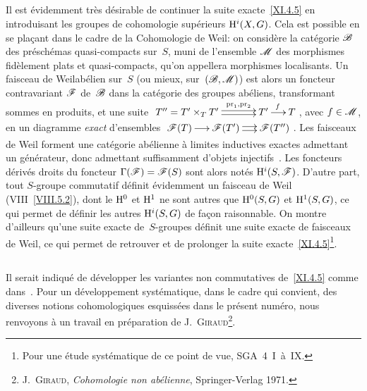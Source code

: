 \subsection{}
\label{XI.4.8}
Il est \'evidemment tr\`es d\'esirable de continuer la suite
exacte~\ref{XI.4.5} en introduisant les groupes de cohomologie
sup\'erieurs $\mathrm{H}^i(X,G)$. Cela est possible en se pla\c cant dans
le cadre de la \og Cohomologie de Weil\fg: on consid\`ere la
cat\'egorie $\cal{B}$ des pr\'esch\'emas quasi-compacts sur~$S$,
muni de l'ensemble $\cal{M}$ des morphismes fid\`element plats et
quasi-compacts, qu'on appellera morphismes localisants. Un \og faisceau
de Weil\fg ab\'elien sur~$S$ (ou mieux, sur~$(\cal{B},\cal{M})$) est
alors un foncteur contravariant $\cal{F}$ de~$\cal{B}$ dans la
cat\'egorie des groupes ab\'eliens, transformant sommes en
produits, et une suite
${\def\labelstyle{\scriptstyle}\xymatrix@C=.5cm{{T''=T'\times_TT'}\ar@<+2pt>[rr]^-{\pr_1,\pr_2}\ar@<-2pt>[rr]&&{T'}\ar[r]^f&{T}}}$, avec $f\in\cal{M}$, en un diagramme \emph{exact}
d'ensembles $\xymatrix@C=.5cm{{\cal{F}(T)}\ar[r]&{\cal{F}(T')}\ar@<2pt>[r]\ar@<-2pt>[r]&{\cal{F}(T'')}}$. Les faisceaux de Weil
forment une cat\'egorie ab\'elienne \`a limites inductives
exactes admettant un g\'en\'erateur, donc admettant suffisamment
d'objets injectifs~\cite{XI.1}. Les foncteurs d\'eriv\'es droits du
foncteur $\Gamma(\cal{F})=\cal{F}(S)$ sont alors not\'es
$\H^i(S,\cal{F})$. D'autre part, tout $S$-groupe commutatif
d\'efinit \'evidemment un faisceau de Weil (VIII~\ref{VIII.5.2}),
dont le $\mathrm{H}^0$ et $\mathrm{H}^1$ ne sont autres que $\mathrm{H}^0(S,G)$ et
$\mathrm{H}^1(S,G)$, ce qui permet de d\'efinir les autres $\mathrm{H}^i(S,G)$ de
fa\c con raisonnable. On
montre d'ailleurs qu'une suite exacte de~$S$-groupes d\'efinit une
suite exacte de faisceaux de Weil, ce qui permet de retrouver et de
prolonger la suite exacte~\ref{XI.4.5}\footnote{Pour une \'etude
syst\'ematique de ce point de vue, \cf SGA~4~I~\`a~IX.}.

\subsection{}
\label{XI.4.9}
Il serait indiqu\'e de d\'evelopper les variantes non commutatives
de~\ref{XI.4.5} comme dans~\cite{XI.2}. Pour un d\'eveloppement
syst\'ematique, dans le cadre qui convient, des diverses notions
cohomologiques esquiss\'ees dans le pr\'esent num\'ero, nous
renvoyons \`a un travail en pr\'eparation de
J.\, \textsc{Giraud}\footnote{\Cf J.\, \textsc{Giraud}, 
\emph{Cohomologie non abélienne},
Springer-Verlag 1971.}.

